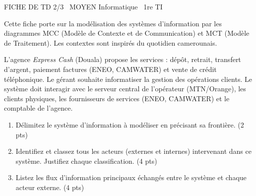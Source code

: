 \documentclass[11pt]{article}
\begin{document}
\begin{tcolorbox}[enhanced,colback=popink,colframe=popink,arc=10pt,boxrule=0pt,left=12pt,right=12pt,top=9pt,bottom=9pt]
{\color{white}\popxbold\small FICHE DE TD 2/3 \textbullet\ MOYEN \hfill Informatique \textbullet\ 1re TI\par}
\end{tcolorbox}
\vspace{4pt}
Cette fiche porte sur la modélisation des systèmes d'information par les diagrammes MCC (Modèle de Contexte et de Communication) et MCT (Modèle de Traitement). Les contextes sont inspirés du quotidien camerounais.

\begin{exercice}
L'agence \textit{Express Cash} (Douala) propose les services : dépôt, retrait, transfert d'argent, paiement factures (ENEO, CAMWATER) et vente de crédit téléphonique. Le gérant souhaite informatiser la gestion des opérations clients. Le système doit interagir avec le serveur central de l'opérateur (MTN/Orange), les clients physiques, les fournisseurs de services (ENEO, CAMWATER) et le comptable de l'agence.
\begin{enumerate}
    \item Délimitez le système d'information à modéliser en précisant sa frontière. (2 pts)
    \item Identifiez et classez tous les acteurs (externes et internes) intervenant dans ce système. Justifiez chaque classification. (4 pts)
    \item Listez les flux d'information principaux échangés entre le système et chaque acteur externe. (4 pts)
\end{enumerate}
\end{exercice}
\end{document}
